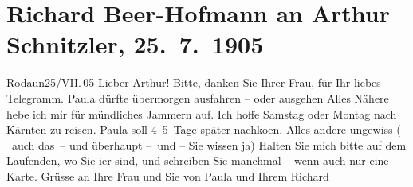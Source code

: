 

         
         \renewcommand{\erwaehntePersonen}{Personen: Paula Beer-Hofmann, Olga Schnitzler}
         \renewcommand{\erwaehnteOrte}{Orte: Kärnten, Reichenau an der Rax, Rodaun}
         \renewcommand{\erwaehnteWerke}{}
               \section[Richard Beer-Hofmann an Arthur Schnitzler, 25. 7. 1905]{ Richard Beer-Hofmann an Arthur Schnitzler, 25. 7. 1905}\nopagebreak{}\rehead{ }\begin{ledgroupsized}[t]{13cm}\normalsize\beginnumbering \toendnotes[C]{\smallbreak\pagebreak[2]} 
\toendnotes[C]{\smallbreak}\pstart
           \raggedleft{}{\pb}Rodaun25/VII. 05\pend
           \pstart
           Lieber Arthur! Bitte, danken Sie Ihrer Frau, für Ihr liebes Telegramm. Paula dürfte übermorgen ausfahren
               – oder ausgehen Alles Nähere hebe ich mir für mündliches Jammern auf. Ich hoffe
                  Samstag oder Montag nach Kärnten zu reisen. Paula soll
               4–5 Tage später nachko{\geminationm}en. Alles andere ungewiss (– auch
               das – und überhaupt – und – Sie wissen ja)\pend
           \pstart
           {\pb}Halten Sie mich bitte auf dem
               Laufenden, wo Sie i{\geminationm}er sind, und schreiben Sie manchmal
               – wenn auch nur eine Karte. Grüsse an Ihre Frau und Sie von Paula und Ihrem\pend
           \pstart \spacefill\mbox{Richard}\pend{}
         
         \endnumbering{}\end{ledgroupsized}  \newcommand{\dateiname}{L01532}\newcommand{\titel}{Richard Beer-Hofmann an Arthur Schnitzler, 25. 7. 1905}\newcommand{\editorInnen}{Martin Anton Müller und Gerd-Hermann Susen}
      